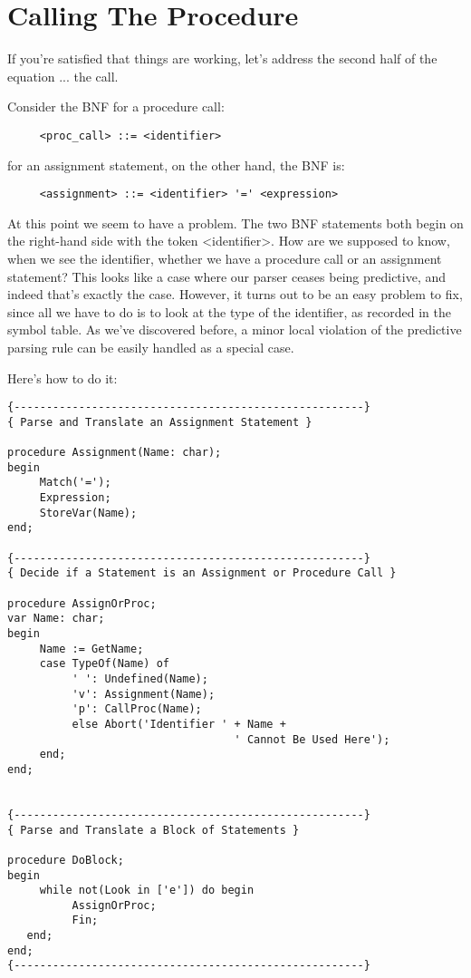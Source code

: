 \section{Calling The Procedure}

If you're satisfied that  things  are  working, let's address the second half of the equation ... the call.

Consider the BNF for a procedure call:

\begin{verbatim}
     <proc_call> ::= <identifier>
\end{verbatim}

for an assignment statement, on the other hand, the BNF is:

\begin{verbatim}
     <assignment> ::= <identifier> '=' <expression>
\end{verbatim}

At this point we seem to  have  a problem. The two BNF statements both begin on the  right-hand  side  with the token <identifier>. How are we supposed to know, when we see the  identifier, whether we have a procedure call or an assignment statement?   This looks like a case where our  parser ceases being predictive, and indeed that's exactly the case. However, it turns  out  to  be  an easy problem to fix, since all we have to do is to look at the type of the identifier, as  recorded  in  the  symbol  table. As we've discovered before, a  minor  local  violation  of  the predictive parsing rule can be easily handled as a special case.

Here's how to do it:

\begin{verbatim}
{------------------------------------------------------}
{ Parse and Translate an Assignment Statement }

procedure Assignment(Name: char);
begin
     Match('=');
     Expression;
     StoreVar(Name);
end;

{------------------------------------------------------}
{ Decide if a Statement is an Assignment or Procedure Call }

procedure AssignOrProc;
var Name: char;
begin
     Name := GetName;
     case TypeOf(Name) of
          ' ': Undefined(Name);
          'v': Assignment(Name);
          'p': CallProc(Name);
          else Abort('Identifier ' + Name +
                                   ' Cannot Be Used Here');
     end;
end;


{------------------------------------------------------}
{ Parse and Translate a Block of Statements }

procedure DoBlock;
begin
     while not(Look in ['e']) do begin
          AssignOrProc;
          Fin;
   end;
end;
{------------------------------------------------------}
\end{verbatim}

